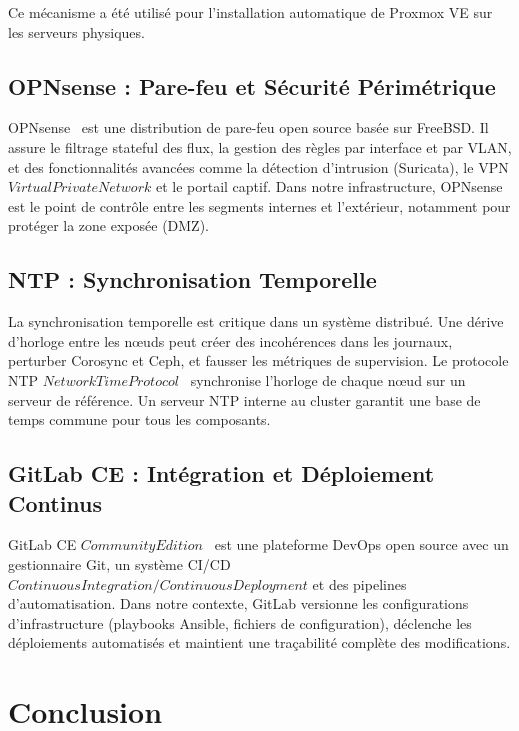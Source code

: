 \par Ce mécanisme a été utilisé pour l'installation automatique de Proxmox VE sur les serveurs physiques.

\subsection{OPNsense : Pare-feu et Sécurité Périmétrique}

\par OPNsense~\cite{refOPNsense} est une distribution de pare-feu open source basée sur FreeBSD. Il assure le filtrage stateful des flux, la gestion des règles par interface et par VLAN, et des fonctionnalités avancées comme la détection d'intrusion (Suricata), le VPN \(Virtual Private Network\) et le portail captif. Dans notre infrastructure, OPNsense est le point de contrôle entre les segments internes et l'extérieur, notamment pour protéger la zone exposée (DMZ).

\subsection{NTP : Synchronisation Temporelle}

\par La synchronisation temporelle est critique dans un système distribué. Une dérive d'horloge entre les n\oe{}uds peut créer des incohérences dans les journaux, perturber Corosync et Ceph, et fausser les métriques de supervision. Le protocole NTP \(Network Time Protocol\)~\cite{refNTP} synchronise l'horloge de chaque n\oe{}ud sur un serveur de référence. Un serveur NTP interne au cluster garantit une base de temps commune pour tous les composants.

\subsection{GitLab CE : Intégration et Déploiement Continus}

\par GitLab CE \(Community Edition\)~\cite{ref40} est une plateforme DevOps open source avec un gestionnaire Git, un système CI/CD \(Continuous Integration / Continuous Deployment\) et des pipelines d'automatisation. Dans notre contexte, GitLab versionne les configurations d'infrastructure (playbooks Ansible, fichiers de configuration), déclenche les déploiements automatisés et maintient une traçabilité complète des modifications.

\section{Conclusion}

